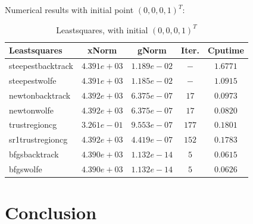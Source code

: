 \documentclass[11pt]{report}
\begin{document}
Numerical results with initial point $(0,0,0,1)^T$:
\begin{table}[htpb]
    \caption{Leastsquares, with initial $(0,0,0,1)^T$}
    \label{tab:Leastsquares_initial}
    \begin{center}
        \begin{tabular}{l|cccc}
\textbf{Leastsquares}           &   \textbf{xNorm}     &\textbf{gNorm}     & \textbf{Iter.}&  \textbf{Cputime}   \\
\hline
steepestbacktrack   &   $4.391e+03 $&   $1.189e-02 $&   $- $&    $1.6771    $    \\
steepestwolfe       &   $4.391e+03 $&   $1.185e-02 $&   $- $&    $1.0915    $    \\
newtonbacktrack     &   $4.392e+03 $&   $6.375e-07 $&   $17   $&    $0.0973    $    \\
newtonwolfe         &   $4.392e+03 $&   $6.375e-07 $&   $17   $&    $0.0820    $    \\
trustregioncg       &   $3.261e-01 $&   $9.553e-07 $&   $177  $&    $0.1801    $    \\
sr1trustregioncg    &   $4.392e+03 $&   $4.419e-07 $&   $152  $&    $0.1783    $    \\
bfgsbacktrack       &   $4.390e+03 $&   $1.132e-14 $&   $5    $&    $0.0615    $    \\
bfgswolfe           &   $4.390e+03 $&   $1.132e-14 $&   $5    $&    $0.0626    $    \\
 \end{tabular}
    \end{center}
\end{table}






\chapter{Conclusion}
\end{document}

